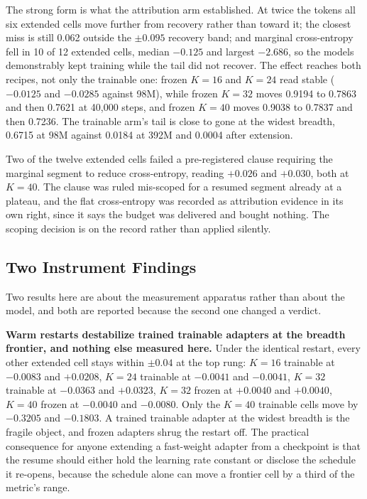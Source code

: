 The strong form is what the attribution arm established. At twice the
tokens all six extended cells move further from recovery rather than
toward it; the closest miss is still 0.062 outside the $\pm 0.095$
recovery band; and marginal cross-entropy fell in 10 of 12 extended
cells, median $-0.125$ and largest $-2.686$, so the models demonstrably
kept training while the tail did not recover. The effect reaches both
recipes, not only the trainable one: frozen $K{=}16$ and $K{=}24$ read
stable ($-0.0125$ and $-0.0285$ against 98M), while frozen $K{=}32$
moves 0.9194 to 0.7863 and then 0.7621 at 40,000 steps, and frozen
$K{=}40$ moves 0.9038 to 0.7837 and then 0.7236. The trainable arm's
tail is close to gone at the widest breadth, 0.6715 at 98M against
0.0184 at 392M and 0.0004 after extension.

Two of the twelve extended cells failed a pre-registered clause
requiring the marginal segment to reduce cross-entropy, reading $+0.026$
and $+0.030$, both at $K{=}40$. The clause was ruled mis-scoped for a
resumed segment already at a plateau, and the flat cross-entropy was
recorded as attribution evidence in its own right, since it says the
budget was delivered and bought nothing. The scoping decision is on the
record rather than applied silently.

\subsection{Two Instrument Findings}

Two results here are about the measurement apparatus rather than about
the model, and both are reported because the second one changed a
verdict.

\textbf{Warm restarts destabilize trained trainable adapters at the breadth
frontier, and nothing else measured here.} Under the identical restart,
every other extended cell stays within $\pm 0.04$ at the top rung:
$K{=}16$ trainable at $-0.0083$ and $+0.0208$, $K{=}24$ trainable at
$-0.0041$ and $-0.0041$, $K{=}32$ trainable at $-0.0363$ and $+0.0323$,
$K{=}32$ frozen at $+0.0040$ and $+0.0040$, $K{=}40$ frozen at
$-0.0040$ and $-0.0080$. Only the $K{=}40$ trainable cells move by
$-0.3205$ and $-0.1803$. A trained trainable adapter at the widest
breadth is the fragile object, and frozen adapters shrug the restart
off. The practical consequence for anyone extending a fast-weight
adapter from a checkpoint is that the resume should either hold the
learning rate constant or disclose the schedule it re-opens, because the
schedule alone can move a frontier cell by a third of the metric's
range.

